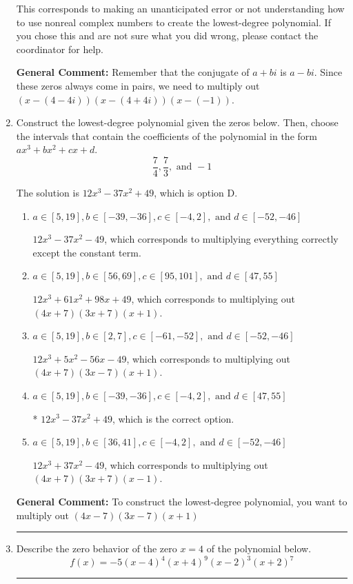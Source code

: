 \documentclass{extbook}[14pt]
\newcommand{\litem}[1]{\item #1

\rule{\textwidth}{0.4pt}}
\begin{document}
\begin{enumerate}
{\begin{enumerate}[label=\Alph*.]
This corresponds to making an unanticipated error or not understanding how to use nonreal complex numbers to create the lowest-degree polynomial. If you chose this and are not sure what you did wrong, please contact the coordinator for help.
\end{enumerate}

\textbf{General Comment:} Remember that the conjugate of $a+bi$ is $a-bi$. Since these zeros always come in pairs, we need to multiply out $(x-(4 - 4 i))(x-(4 + 4 i))(x-(-1))$.
}
\litem{
Construct the lowest-degree polynomial given the zeros below. Then, choose the intervals that contain the coefficients of the polynomial in the form $ax^3+bx^2+cx+d$.
\[ \frac{7}{4}, \frac{7}{3}, \text{ and } -1 \]

The solution is \( 12x^{3} -37 x^{2} + 49 \), which is option D.\begin{enumerate}[label=\Alph*.]
\item \( a \in [5, 19], b \in [-39, -36], c \in [-4, 2], \text{ and } d \in [-52, -46] \)

$12x^{3} -37 x^{2} -49$, which corresponds to multiplying everything correctly except the constant term.
\item \( a \in [5, 19], b \in [56, 69], c \in [95, 101], \text{ and } d \in [47, 55] \)

$12x^{3} +61 x^{2} +98 x + 49$, which corresponds to multiplying out $(4x + 7)(3x + 7)(x + 1)$.
\item \( a \in [5, 19], b \in [2, 7], c \in [-61, -52], \text{ and } d \in [-52, -46] \)

$12x^{3} +5 x^{2} -56 x -49$, which corresponds to multiplying out $(4x + 7)(3x -7)(x + 1)$.
\item \( a \in [5, 19], b \in [-39, -36], c \in [-4, 2], \text{ and } d \in [47, 55] \)

* $12x^{3} -37 x^{2} + 49$, which is the correct option.
\item \( a \in [5, 19], b \in [36, 41], c \in [-4, 2], \text{ and } d \in [-52, -46] \)

$12x^{3} +37 x^{2} -49$, which corresponds to multiplying out $(4x + 7)(3x + 7)(x -1)$.
\end{enumerate}

\textbf{General Comment:} To construct the lowest-degree polynomial, you want to multiply out $(4x -7)(3x -7)(x + 1)$
}
\litem{
Describe the zero behavior of the zero $x = 4$ of the polynomial below.
\[ f(x) = -5(x - 4)^{4}(x + 4)^{9}(x - 2)^{3}(x + 2)^{7} \]

}
\end{enumerate}
\end{document}
